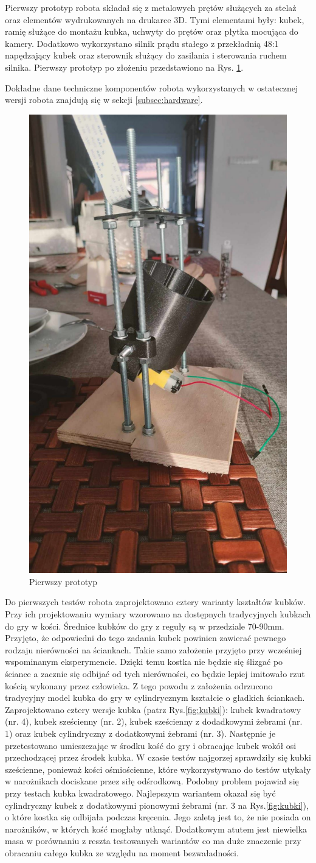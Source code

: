 Pierwszy prototyp robota składał się z metalowych prętów służących za stelaż oraz elementów wydrukowanych na drukarce 3D.
Tymi elementami były: kubek, ramię służące do montażu kubka, uchwyty do prętów oraz płytka mocująca do kamery. Dodatkowo
wykorzystano silnik prądu stałego z przekładnią 48:1 napędzający kubek oraz sterownik służący do zasilania i sterowania ruchem silnika. \cite{wheel} \cite{L298}
Pierwszy prototyp po złożeniu przedstawiono na Rys. \ref{fig:pierwszy}.

Dokładne dane techniczne komponentów robota wykorzystanych w ostatecznej wersji robota znajdują się w sekcji \ref{subsec:hardware}.

\begin{figure}[H]
    \centering
    \includegraphics[width=0.25\linewidth, trim={35mm 75mm 35mm 30mm}, clip]{chapters/03-praca-wlasna/figures/pierwszy}
    \caption{\label{fig:pierwszy}Pierwszy prototyp}
\end{figure}

Do pierwszych testów robota zaprojektowano cztery warianty kształtów kubków. Przy ich projektowaniu wymiary wzorowano na dostępnych tradycyjnych kubkach do gry w kości.
Średnice kubków do gry z reguły są w przedziale 70-90mm.\cite{cup} Przyjęto, że odpowiedni do tego zadania kubek powinien
zawierać pewnego rodzaju nierówności na ściankach. Takie samo założenie przyjęto przy wcześniej wspominanym eksperymencie.\cite{PK} Dzięki temu kostka nie będzie się ślizgać po ściance a zacznie się odbijać od tych nierówności, co 
będzie lepiej imitowało rzut kością wykonany przez człowieka. Z tego powodu z założenia odrzucono tradycyjny model kubka do gry w cylindrycznym kształcie 
o gładkich ściankach. Zaprojektowano cztery wersje kubka (patrz Rys.\ref{fig:kubki}): kubek kwadratowy (nr. 4), kubek sześcienny (nr. 2), kubek sześcienny z dodadkowymi żebrami (nr. 1)
oraz kubek cylindryczny z dodatkowymi żebrami (nr. 3). 
Następnie je przetestowano umieszczając w środku kość do gry i obracając kubek wokół osi przechodzącej przez środek kubka. W czasie testów najgorzej sprawdziły się kubki sześcienne,
ponieważ kości ośmiościenne, które wykorzystywano do testów utykały w narożnikach dociskane przez siłę odśrodkową. Podobny problem pojawiał się przy testach kubka kwadratowego.
Najlepszym wariantem okazał się być cylindryczny kubek z dodatkowymi pionowymi żebrami (nr. 3 na Rys.\ref{fig:kubki}), o które kostka się odbijała podczas kręcenia.
Jego zaletą jest to, że nie posiada on narożników, w których kość mogłaby utknąć. Dodatkowym atutem jest niewielka masa w porównaniu z reszta testowanych wariantów co ma duże znaczenie 
przy obracaniu całego kubka ze względu na moment bezwaładności. \cite{bezwladnosc}

